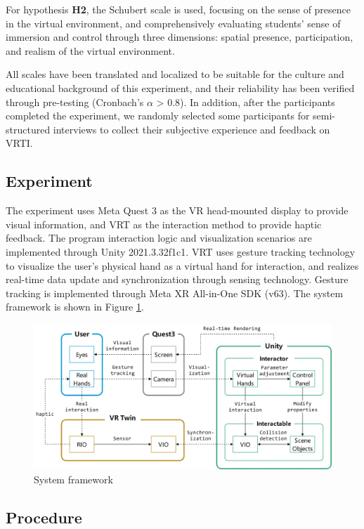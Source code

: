 \documentclass[runningheads]{llncs}
\begin{document}
For hypothesis \textbf{H2}, the Schubert scale \cite{schubert2001experience} is used, focusing on the sense of presence in the virtual environment, and comprehensively evaluating students' sense of immersion and control through three dimensions: spatial presence, participation, and realism of the virtual environment.

All scales have been translated and localized to be suitable for the culture and educational background of this experiment, and their reliability has been verified through pre-testing (Cronbach's $\alpha$ > 0.8). In addition, after the participants completed the experiment, we randomly selected some participants for semi-structured interviews to collect their subjective experience and feedback on VRTI.

\subsection{Experiment}
The experiment uses Meta Quest 3 as the VR head-mounted display to provide visual information, and VRT as the interaction method to provide haptic feedback. The program interaction logic and visualization scenarios are implemented through Unity 2021.3.32f1c1. VRT uses gesture tracking technology to visualize the user's physical hand as a virtual hand for interaction, and realizes real-time data update and synchronization through sensing technology. Gesture tracking is implemented through Meta XR All-in-One SDK (v63). The system framework is shown in Figure \ref{fig:system-framework-flowchart}.

\begin{figure}[t]
  \centering
  \includegraphics[width=1\textwidth]{image/system-framework-flowchart.pdf}
  \caption{System framework}
  \label{fig:system-framework-flowchart}
\end{figure}

\subsection{Procedure}
\end{document}
